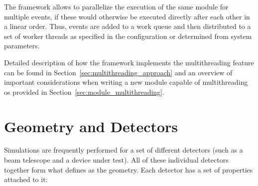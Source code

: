 The framework allows to parallelize the execution of the same module for multiple events, if these would otherwise be executed directly after each other in a linear order.
Thus, events are added to a work queue and then distributed to a set of worker threads as specified in the configuration or determined from system parameters.

Detailed description of how the framework implements the multithreading feature can be found in Section~\ref{sec:multithreading_approach} and an overview of important considerations when writing a new module capable of multithreading os provided in Section~\ref{sec:module_multithreading}.

\section{Geometry and Detectors}
\label{sec:models_geometry}
Simulations are frequently performed for a set of different detectors (such as a beam telescope and a device under test).
All of these individual detectors together form what \apsq defines as the geometry.
Each detector has a set of properties attached to it:
